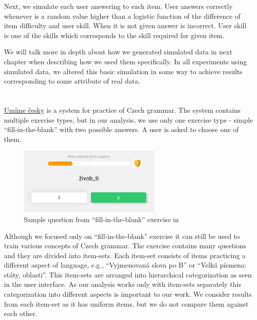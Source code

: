 \documentclass[
  digital, %
  table,   %
  nolof,     %
  nolot,     %
  nocover,
  color
]{fithesis3}
\begin{document}
Next, we simulate each user answering to each item. User answers correctly whenever is a random value higher than a logistic function of the difference of item difficulty and user skill. When it is not given answer is incorrect. User skill is one of the skills which corresponds to the skill required for given item.

We will talk more in depth about how we generated simulated data in next chapter when describing how we used them specifically. In all experiments using simulated data, we altered this basic simulation in some way to achieve results corresponding to some attribute of real data.


\section{\umimeCesky{}}\label{umime-cesky}


\href{https://umimecesky.cz/}{Umíme česky} is a system for practice of Czech grammar. The system contains multiple exercise types, but in our analysis, we use only one exercise type - simple ``fill-in-the-blank'' with two possible answers. A user is asked to choose one of them.

\begin{figure}
  \includegraphics[width=7cm]{img/umimecesky_doplnovacka}
  \caption{Sample question from ``fill-in-the-blank'' exercise in \umimeCesky{}}
  \label{fig:umimeceskydoplnovacka}
\end{figure}

Although we focused only on ``fill-in-the-blank'' exercise it can still be used to train various concepts of Czech grammar. The exercise contains many questions and they are divided into item-sets. Each item-set consists of items practicing a different aspect of language, e.g., ``Vyjmenovaná slova po B'' or ``Velká písmena: státy, oblasti''. This item-sets are arranged into hierarchical categorization as seen in the user interface. As our analysis works only with item-sets separately this categorization into different aspects is important to our work. We consider results from each item-set as it has uniform items, but we do not compare them against each other.
\end{document}
